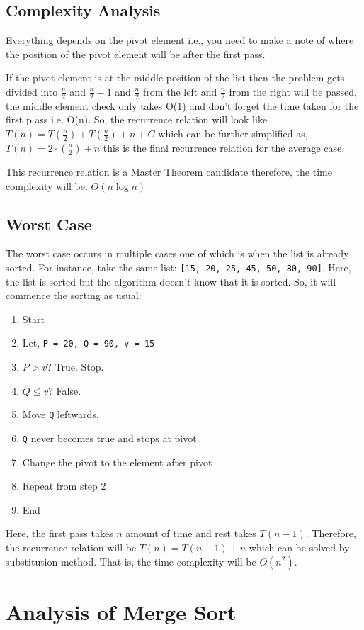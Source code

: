 \documentclass[a4paper,12pt]{article}
\theoremstyle{definition}
\begin{document}
    \subsection{Complexity Analysis}

    Everything depends on the pivot element i.e., you need to make a note of where the position of the pivot
    element will be after the first pass.

    If the pivot element is at the middle position of the list then the problem gets divided into
    $\frac{n}{2}$ and $\frac{n}{2} - 1$ and $\frac{n}{2}$ from the left and $\frac{n}{2}$ from the right
    will be passed, the middle element check only takes O(1) and don't forget the time taken for the first p
    ass i.e. O(n).
    So, the recurrence relation will look like $T(n) = T\left(\frac{n}{2}\right) + T\left(\frac{n}{2}\right) + n + C$
    which can be further simplified as, $T(n) = 2 \cdot \left(\frac{n}{2}\right) + n$ this is the final recurrence
    relation for the average case.

    This recurrence relation is a Master Theorem candidate therefore, the time complexity will be: $O(n\log n)$

    \subsection*{Worst Case}

    The worst case occurs in multiple cases one of which is when the list is already sorted.
    For instance, take the same list: \texttt{[15, 20, 25, 45, 50, 80, 90]}.
    Here, the list is sorted but the algorithm doesn't know that it is sorted.
    So, it will commence the sorting as usual:

    \begin{enumerate}
        \item Start
        \item Let, \texttt{P = 20, Q = 90, v = 15}
        \item $P > v$? True. Stop.
        \item $Q \leq v$? False.
        \item Move \texttt{Q} leftwards.
        \item \texttt{Q} never becomes true and stops at pivot.
        \item Change the pivot to the element after pivot
        \item Repeat from step 2
        \item End
    \end{enumerate}

    Here, the first pass takes $n$ amount of time and rest takes $T(n - 1)$.
    Therefore, the recurrence relation will be $T(n) = T(n - 1) + n$ which can be solved by substitution method.
    That is, the time complexity will be $O(n^2)$.


    \section{Analysis of Merge Sort}
\end{document}
